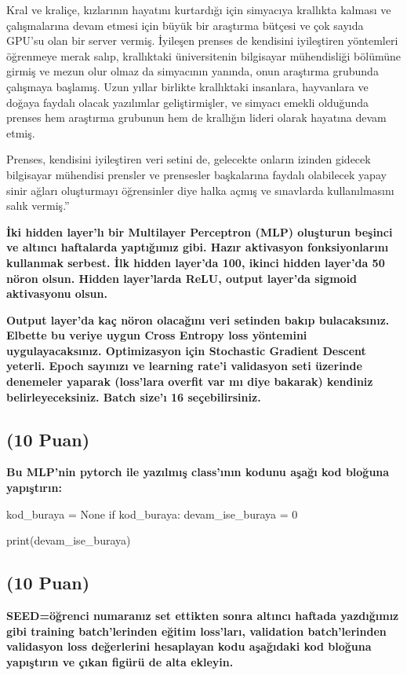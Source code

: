 \documentclass[11pt]{article}
\begin{document}
Kral ve kraliçe, kızlarının hayatını kurtardığı için simyacıya krallıkta kalması ve çalışmalarına devam etmesi için büyük bir araştırma bütçesi ve çok sayıda GPU'su olan bir server vermiş. İyileşen prenses de kendisini iyileştiren yöntemleri öğrenmeye merak salıp, krallıktaki üniversitenin bilgisayar mühendisliği bölümüne girmiş ve mezun olur olmaz da simyacının yanında, onun araştırma grubunda çalışmaya başlamış. Uzun yıllar birlikte krallıktaki insanlara, hayvanlara ve doğaya faydalı olacak yazılımlar geliştirmişler, ve simyacı emekli olduğunda prenses hem araştırma grubunun hem de krallığın lideri olarak hayatına devam etmiş.

Prenses, kendisini iyileştiren veri setini de, gelecekte onların izinden gidecek bilgisayar mühendisi prensler ve prensesler başkalarına faydalı olabilecek yapay sinir ağları oluşturmayı öğrensinler diye halka açmış ve sınavlarda kullanılmasını salık vermiş.''

\textbf{İki hidden layer'lı bir Multilayer Perceptron (MLP) oluşturun beşinci ve altıncı haftalarda yaptığımız gibi. Hazır aktivasyon fonksiyonlarını kullanmak serbest. İlk hidden layer'da 100, ikinci hidden layer'da 50 nöron olsun. Hidden layer'larda ReLU, output layer'da sigmoid aktivasyonu olsun.}

\textbf{Output layer'da kaç nöron olacağını veri setinden bakıp bulacaksınız. Elbette bu veriye uygun Cross Entropy loss yöntemini uygulayacaksınız. Optimizasyon için Stochastic Gradient Descent yeterli. Epoch sayınızı ve learning rate'i validasyon seti üzerinde denemeler yaparak (loss'lara overfit var mı diye bakarak) kendiniz belirleyeceksiniz. Batch size'ı 16 seçebilirsiniz.}

\subsection{(10 Puan)} \textbf{Bu MLP'nin pytorch ile yazılmış class'ının kodunu aşağı kod bloğuna yapıştırın:}

\begin{python}
kod_buraya = None
if kod_buraya:
    devam_ise_buraya = 0

print(devam_ise_buraya)
\end{python}

\subsection{(10 Puan)} \textbf{SEED=öğrenci numaranız set ettikten sonra altıncı haftada yazdığımız gibi training batch'lerinden eğitim loss'ları, validation batch'lerinden validasyon loss değerlerini hesaplayan kodu aşağıdaki kod bloğuna yapıştırın ve çıkan figürü de alta ekleyin.}
\end{document}
